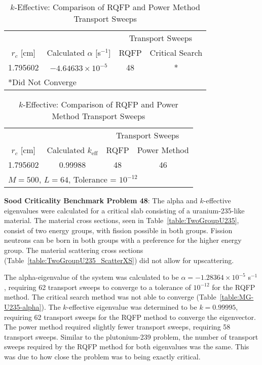 \begin{table}[!htbp]
	\caption{Calculated Eigenvalues and Transport Sweep Comparisons for Two-Group Pu-239 Cross Sections in \cite{sood2003analytical}}
	\label{table:SlabMG-Pu239}
	\begin{subtable}[!htbp]{1.0\textwidth}
	\centering{}
	\begin{tabular}{@{}cccc@{}}\toprule
	& & \multicolumn{2}{c}{Transport Sweeps} \\
	\cmidrule{3-4} $r_{c}$ [cm] & Calculated $\alpha$ [s$^{-1}$] & RQFP & Critical Search\\
	\midrule
	1.795602 & $-4.64633 \times 10^{-5}$ & 48 & * \\
	\bottomrule
	\multicolumn{4}{l}{*Did Not Converge} \\
	\end{tabular}
	\caption{Alpha-Eigenvalue: Comparison of RQFP and Critical Search Transport Sweeps}
	\label{table:MG-Pu239-alpha}
	\end{subtable}%
	\vspace{0.25cm}
	\begin{subtable}[!htbp]{1.0\textwidth}
	\centering{}
	\begin{tabular}{@{}cccc@{}}\toprule
	& & \multicolumn{2}{c}{Transport Sweeps} \\
	\cmidrule{3-4} $r_{c}$ [cm] & Calculated $k_{\text{eff}}$ & RQFP & Power Method \\
	\midrule
	1.795602 & 0.99988 & 48 & 46 \\
	\bottomrule%
	\multicolumn{4}{l}{$M = 500$, $L = 64$, Tolerance = $10^{-12}$} \\
	\end{tabular}
	\caption{$k$-Effective: Comparison of RQFP and Power Method Transport Sweeps}
	\label{table:MG-Pu239-k}
	\end{subtable}
\end{table}

\clearpage

\textbf{Sood Criticality Benchmark Problem 48}: The alpha and $k$-effective eigenvalues were calculated for a critical slab consisting of a uranium-235-like material. The material cross sections, seen in Table~\ref{table:TwoGroupU235}, consist of two energy groups, with fission possible in both groups. Fission neutrons can be born in both groups with a preference for the higher energy group. The material scattering cross sections (Table~\ref{table:TwoGroupU235_ScatterXS}) did not allow for upscattering.

The alpha-eigenvalue of the system was calculated to be $\alpha = -1.28364 \times 10^{-5}$ s$^{-1}$, requiring 62 transport sweeps to converge to a tolerance of $10^{-12}$ for the RQFP method. The critical search method was not able to converge (Table~\ref{table:MG-U235-alpha}). The $k$-effective eigenvalue was determined to be $k=0.99995$, requiring 62 transport sweeps for the RQFP method to converge the eigenvector. The power method required slightly fewer transport sweeps, requiring 58 transport sweeps. Similar to the plutonium-239 problem, the number of transport sweeps required by the RQFP method for both eigenvalues was the same. This was due to how close the problem was to being exactly critical.

